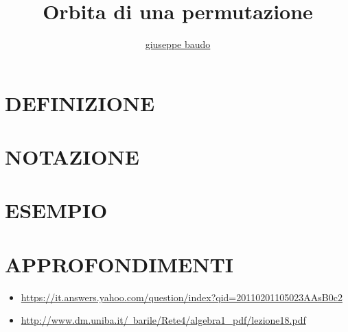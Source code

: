 \documentclass[a4paper,10pt]{article}
\title{Orbita di una permutazione}
\author{\href{http://www.baudo.hol.es}{giuseppe baudo}}
\begin{document}
\maketitle

\section{DEFINIZIONE}

\section{NOTAZIONE}

\section{ESEMPIO}

\section{APPROFONDIMENTI}
\begin{itemize}
 \item \href{https://it.answers.yahoo.com/question/index?qid=20110201105023AAsB0c2}{https://it.answers.yahoo.com/question/index?qid=20110201105023AAsB0c2}
 \item \href{http://www.dm.uniba.it/~barile/Rete4/algebra1_pdf/lezione18.pdf}{http://www.dm.uniba.it/~barile/Rete4/algebra1_pdf/lezione18.pdf}
 \end{itemize}
\end{document}
